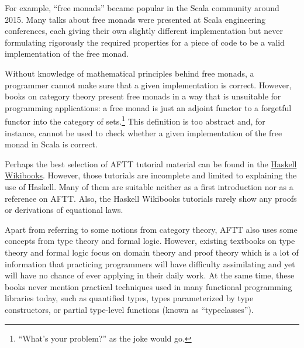 For example, ``free monads'' became popular in the Scala community
around 2015. Many talks about free monads were presented at Scala
engineering conferences, each giving their own slightly different
implementation but never formulating rigorously the required properties
for a piece of code to be a valid implementation of the free monad.

Without knowledge of mathematical principles behind free monads, a
programmer cannot make sure that a given implementation is correct.
However, books on category theory present free monads in a way that
is unsuitable for programming applications: a free monad is just an
adjoint functor to a forgetful functor into the category of sets.\footnote{``What's your problem?'' as the joke would go.}
This definition is too abstract and, for instance, cannot be used
to check whether a given implementation of the free monad in Scala
is correct.

Perhaps the best selection of AFTT tutorial material can be found
in the \href{https://en.wikibooks.org/wiki/Haskell}{Haskell Wikibooks}.
However, those tutorials are incomplete and limited to explaining
the use of Haskell. Many of them are suitable neither as a first introduction
nor as a reference on AFTT. Also, the Haskell Wikibooks tutorials
rarely show any proofs or derivations of equational laws.

Apart from referring to some notions from category theory, AFTT also
uses some concepts from type theory and formal logic. However, existing
textbooks on type theory and formal logic focus on domain theory and
proof theory \textendash{} which is a lot of information that practicing
programmers will have difficulty assimilating and yet will have no
chance of ever applying in their daily work. At the same time, these
books never mention practical techniques used in many functional programming
libraries today, such as quantified types, types parameterized by
type constructors, or partial type-level functions (known as ``typeclasses'').

